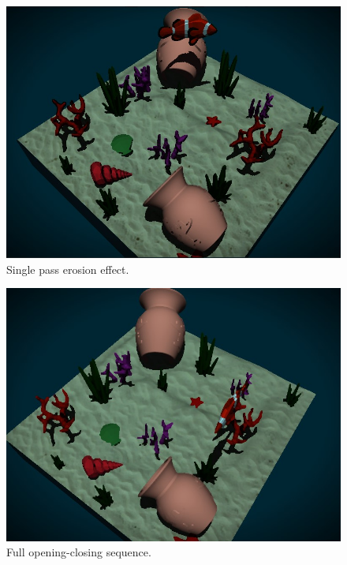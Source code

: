 \documentclass{article}
\begin{document}
\vspace{5em}

\begin{figure}[h]
    \centering
    \includegraphics[width=\columnwidth]{imgs/erosion.jpg}
    \caption{Single pass erosion effect.}
    \label{fig:erosion_ms}
\end{figure}

\newpage

\begin{figure}[h]
    \vspace{1cm}
    \centering
    \includegraphics[width=\columnwidth]{imgs/opening_closing.jpg}
    \caption{Full opening-closing sequence.}
    \label{fig:opening_closing_ms}
\end{figure}
\end{document}
